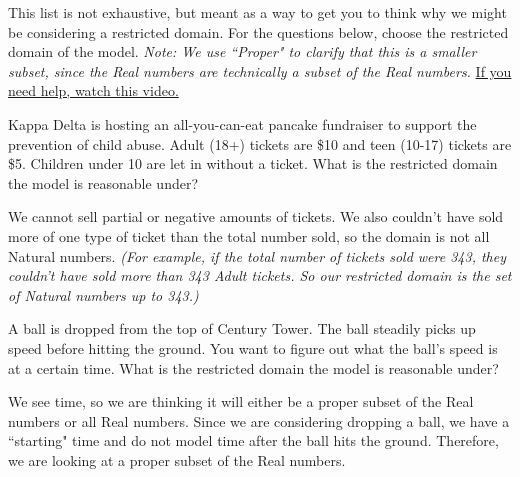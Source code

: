 \documentclass{ximera}
\begin{document}
This list is not exhaustive, but meant as a way to get you to think why we might be considering a restricted domain. For the questions below, choose the restricted domain of the model. \textit{Note: We use ``Proper" to clarify that this is a smaller subset, since the Real numbers are technically a subset of the Real numbers.} \href{https://www.youtube.com/watch?v=eWlkbv7m76c&list=PLsCqF7qYpC5ZynJm-TTnZ6OsnKOwU7hs_&index=2}{If you need help, watch this video.}

\begin{question}
Kappa Delta is hosting an all-you-can-eat pancake fundraiser to support the prevention of child abuse. Adult (18+) tickets are \$10 and teen (10-17) tickets are \$5. Children under 10 are let in without a ticket. What is the restricted domain the model is reasonable under?

\begin{multipleChoice}
\end{multipleChoice}

\begin{feedback}[correct]
We cannot sell partial or negative amounts of tickets. We also couldn't have sold more of one type of ticket than the total number sold, so the domain is not all Natural numbers. \textit{(For example, if the total number of tickets sold were 343, they couldn't have sold more than 343 Adult tickets. So our restricted domain is the set of Natural numbers up to 343.)}
\end{feedback}
\end{question}

\begin{question}
A ball is dropped from the top of Century Tower. The ball steadily picks up speed before hitting the ground. You want to figure out what the ball's speed is at a certain time. What is the restricted domain the model is reasonable under?

\begin{multipleChoice}
\end{multipleChoice}

\begin{feedback}[correct]
We see time, so we are thinking it will either be a proper subset of the Real numbers or all Real numbers. Since we are considering dropping a ball, we have a ``starting" time and do not model time after the ball hits the ground. Therefore, we are looking at a proper subset of the Real numbers. 
\end{feedback}

\end{question}
\end{document}
